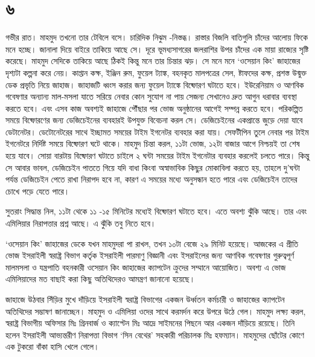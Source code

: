 \documentclass[
]{book}
\begin{document}
\section*{৬}\label{ota-1-6}

গভীর রাত। মাহমুদ তখনো তার টেবিলে বসে। চারিদিক নিঝুম -নিস্তব্ধ। রাস্তার বিজলি বাতিগুলি চাঁদের আলোয় ফিকে মনে হচ্ছে। জানালা দিয়ে বাইরে তাকিয়ে আছে সে। দূরে ভূমধ্যসাগরের জলরাশির উপর চাঁদের এক মায়া রাজ্যের সৃষ্টি করেছে। মাহমুদ সেদিকে তাকিয়ে আছে ঠিকই কিন্তু মনে তার চিন্তার ঝড়। সে মনে মনে `ওসেয়ান কিং' জাহাজের দৃশ্যটা কল্পনা করে নেয়। কাপ্তান কক্ষ, ইঞ্জিন রুম, ফুয়েল ট্যাঙ্ক, বহনকৃত মালপত্রের সেল, ষ্টাফদের কক্ষ, প্রশস্ত উন্মুক্ত ডেক প্রভৃতি নিয়ে জাহাজ। জাহাজটি ধ্বংস করার জন্য ফুয়েল ট্যাঙ্কে বিষ্ফোরণ ঘটাতে হবে। ইউরেনিয়াম ও আণবিক গবেষণার অন্যান্য মাল-মসলা যাতে সরিয়ে নেবার কোন সুযোগ না পায় সেজন্য সেখানেও দ্রুত আগুন ধরাবার ব্যবস্থা করতে হবে। এবং এসব কাজ অবশ্যই জাহাজে পৌঁছার পর ভোজ অনুষ্ঠানের আগেই সম্পন্ন করতে হবে। পরিকল্পিত সময়ে বিষ্ফোরণের জন্য ডেজিচেইনের ব্যবহারই উপযুক্ত বিবেচনা করল সে। ডেজিচেইনের একপ্রান্তে জুড়ে দেয়া যাবে ডেটানেটর। ডেটোনেটরের সাথে ইচ্ছামত সময়ের টাইম ইগনেটর ব্যবহার করা যায়। সেফটীপিন তুলে নেবার পর টাইম ইগনেটরে নির্দিষ্ট সময়ে বিষ্ফোরণ ঘটে থাকে। মাহমুদ চিন্তা করল, ১১টা ভোজ, ১২টা বাজার আগে নিশ্চয়ই তা শেষ হয়ে যাবে। সোয়া বারটায় বিষ্ফোরণ ঘটাতে চাইলে ২ ঘন্টা সময়ের টাইম ইগনেটার ব্যবহার করলেই চলতে পারে। কিন্তু সে আবার ভাবল, ডেজিচেইন পাততে গিয়ে যদি বাধা কিংবা অস্বাভাবিক কিছুর মোকাবিলা করতে হয়, তাহলে দু'ঘন্টা পর্যন্ত ডেজিচেইন পেতে রাখা নিরাপদ হবে না, কারণ এ সময়ের মধ্যে অনুসন্ধান হতে পারে এবং ডেজিচেইন তাদের চোখে পড়ে যেতে পারে।

সুতরাং সিদ্ধান্ত নিল, ১১টা থেকে ১১ -১৫ মিনিটের মধ্যেই বিষ্ফোরণ ঘটাতে হবে। এতে অবশ্য ঝুঁকি আছে। তার এবং এমিলিয়ার নিরাপত্তার প্রশ্ন আছে। এ ঝুঁকি তবু নিতে হবে।

`ওসেয়ান কিং' জাহাজের ডেকে যখন মাহমুদরা পা রাখল, তখন ১০টা বেজে ২৯ মিনিট হয়েছে। আজকের এ প্রীতি ভোজ ইসরাইলী স্বরাষ্ট্র বিভাগ কর্তৃক ইসরাইলী পারমাণু বিজ্ঞানী এবং ইসরাইলের জন্য আণবিক গবেষণার গুরুত্বপূর্ণ মালমসলা ও যন্ত্রপাতি বহনকারী ওসেয়ান কিং জাহাজের ক্যাপটেন ক্রুদের সম্মানে আয়োজিত। অবশ্য এ ভোজ এমিলিয়াদের মত বাছাই করা কিছু অতিথিদেরও আমন্ত্রণ জানানো হয়েছে।

জাহাজে উঠবার সিঁড়ির মুখে দাঁড়িয়ে ইসরাইলী স্বরাষ্ট্র বিভাগের একজন উর্ধ্বতন কর্মচারী ও জাহাজের ক্যাপটেন অতিথিদের সম্ভাষণ জানাচ্ছেন। মাহমুদ ও এমিলিয়া ওদের সাথে করমর্দন করে উপরে উঠে গেল। মাহমুদ লক্ষ্য করল, স্বরাষ্ট্র বিভাগীয় অফিসার মিঃ গ্রিনবার্জ ও ক্যাপ্টেন মিঃ আদ্রে সাইমনের পিছনে আর একজন দাঁড়িয়ে রয়েছে। তিনি হলেন ইসরাইলী আভ্যন্তরীণ নিরাপত্তা বিভাগ `সিন বেথের' সহকারী পরিচালক মিঃ হফম্যান। মাহমুদের ছোঁটের কোণে এক টুকরো বাঁকা হাসি খেলে গেলে।
\end{document}
